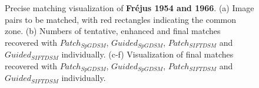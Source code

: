 \begin{figure}[htbp]
\begin{center}
{\begin{minipage}[t]{0.48\linewidth}
			\end{minipage}%
		}
		\caption{Precise matching visualization of \textbf{Fr{\'e}jus 1954 and 1966}. (a) Image pairs to be matched, with red rectangles indicating the common zone. (b) Numbers of tentative, enhanced and final matches recovered with $Patch_{SpGDSM}$, $Guided_{SpGDSM}$, $Patch_{SIFTDSM}$ and $Guided_{SIFTDSM}$ individually. (c-f) Visualization of final matches recovered with $Patch_{SpGDSM}$, $Guided_{SpGDSM}$, $Patch_{SIFTDSM}$ and $Guided_{SIFTDSM}$ individually.}
		\label{MatchVizFrejus1954-1966}
	\end{center}
\end{figure} 

